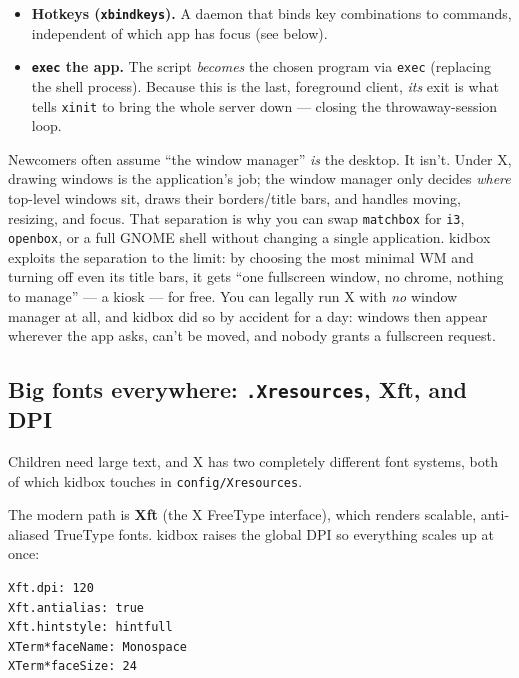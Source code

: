 \documentclass[11pt,oneside]{article}
\newcommand{\code}[1]{\texorpdfstring{\textcolor{kbblue}{\texttt{#1}}}{#1}}
\newcommand{\file}[1]{\textcolor{kbteal}{\texttt{#1}}}
\begin{document}
\begin{itemize}
both options take a yes/no value, and a bare \code{-use\_lowlight} makes matchbox
print its usage and exit, silently leaving the session with no window manager.
\item \textbf{Hotkeys (\texttt{xbindkeys}).} A daemon that binds key
combinations to commands, independent of which app has focus (see below).
\item \textbf{\code{exec} the app.} The script \emph{becomes} the chosen program
via \code{exec} (replacing the shell process). Because this is the last,
foreground client, \emph{its} exit is what tells \texttt{xinit} to bring the
whole server down --- closing the throwaway-session loop.
\end{itemize}

\begin{deeper}
Newcomers often assume ``the window manager'' \emph{is} the desktop. It isn't.
Under X, drawing windows is the application's job; the window manager only
decides \emph{where} top-level windows sit, draws their borders/title bars, and
handles moving, resizing, and focus. That separation is why you can swap
\texttt{matchbox} for \texttt{i3}, \texttt{openbox}, or a full GNOME shell
without changing a single application. kidbox exploits the separation to the
limit: by choosing the most minimal WM and turning off even its title bars, it
gets ``one fullscreen window, no chrome, nothing to manage'' --- a kiosk --- for
free. You can legally run X with \emph{no} window manager at all, and kidbox
did so by accident for a day: windows then appear wherever the app asks, can't
be moved, and nobody grants a fullscreen request.
\end{deeper}

\subsection{Big fonts everywhere: \texttt{.Xresources}, Xft, and DPI}

Children need large text, and X has two completely different font systems, both
of which kidbox touches in \file{config/Xresources}.

The modern path is \textbf{Xft} (the X FreeType interface), which renders
scalable, anti-aliased TrueType fonts. kidbox raises the global DPI so
everything scales up at once:

\begin{lstlisting}
Xft.dpi: 120
Xft.antialias: true
Xft.hintstyle: hintfull
XTerm*faceName: Monospace
XTerm*faceSize: 24
\end{lstlisting}
\end{document}

